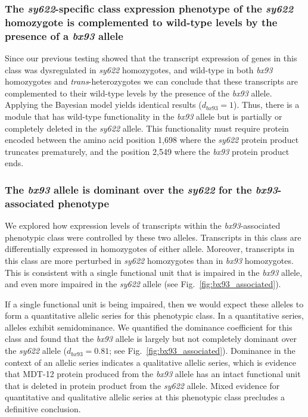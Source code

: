 \documentclass[10pt, twocolumn]{article}
\newcommand{\protein}[1]{\mbox{\uppercase{#1}}}
\begin{document}
\subsubsection*{The \emph{sy622}-specific class expression phenotype of the
                \emph{sy622} homozygote is complemented to wild-type levels by
                the presence of a \emph{bx93} allele}
Since our previous testing showed that the transcript expression of genes in
this class was dysregulated in \emph{sy622} homozygotes, and wild-type in both
\emph{bx93} homozygotes and \emph{trans}-heterozygotes we can conclude that
these transcripts are complemented to their wild-type levels by the presence of
the \emph{bx93} allele. Applying the Bayesian model yields identical results
($d_{bx93} = 1$). Thus, there is a module that has wild-type functionality in
the \emph{bx93} allele but is partially or completely deleted in the
\emph{sy622} allele. This functionality must require protein encoded between the
amino acid position 1,698 where the \emph{sy622} protein product truncates
prematurely, and the position 2,549 where the \emph{bx93} protein product ends.

\subsubsection*{The \emph{bx93} allele is dominant over the \emph{sy622} for the
                \emph{bx93}-associated phenotype}
We explored how expression levels of transcripts within the
\emph{bx93}-associated phenotypic class were controlled by these two alleles.
Transcripts in this class are differentially expressed in homozygotes of either
allele. Moreover, transcripts in this class are more perturbed in \emph{sy622}
homozygotes than in \emph{bx93} homozygotes. This is consistent with a single
functional unit that is impaired in the \emph{bx93} allele, and even more
impaired in the \emph{sy622} allele (see Fig.~\ref{fig:bx93_associated}).

If a single functional unit is being impaired, then we would expect these
alleles to form a quantitative allelic series for this phenotypic class. In a
quantitative series, alleles exhibit semidominance. We quantified the dominance
coefficient for this class and found that the \emph{bx93} allele is largely but
not completely dominant over the \emph{sy622} allele ($d_{bx93}=0.81$; see
Fig.~\ref{fig:bx93_associated}). Dominance in the context of an allelic series
indicates a qualitative allelic series, which is evidence that \protein{MDT-12}
protein produced from the \emph{bx93} allele has an intact functional unit that
is deleted in protein product from the \emph{sy622} allele. Mixed evidence for
quantitative and qualitative allelic series at this phenotypic class precludes a
definitive conclusion.
\end{document}
